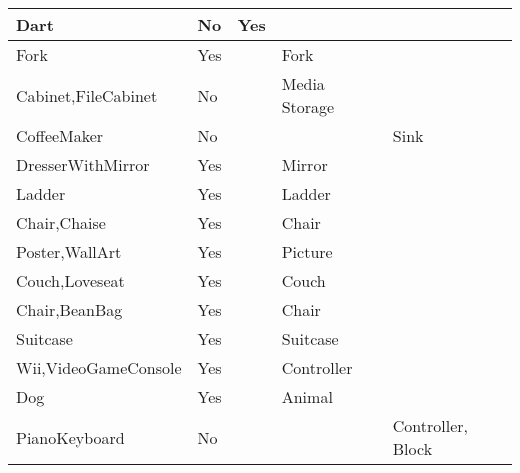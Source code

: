 \documentclass{article}
\begin{document}
\begin{longtable}{|l|l|l|l|l|}
Dart                                     & No               & Yes                            &                &                             \\ \hline
Fork                                     & Yes              &                                & Fork           &                             \\ \hline
Cabinet,FileCabinet                      & No               &                                & Media Storage  &                             \\ \hline
CoffeeMaker                              & No               &                                &                & Sink                        \\ \hline
DresserWithMirror                        & Yes              &                                & Mirror         &                             \\ \hline
Ladder                                   & Yes              &                                & Ladder         &                             \\ \hline
Chair,Chaise                             & Yes              &                                & Chair          &                             \\ \hline
Poster,WallArt                           & Yes              &                                & Picture        &                             \\ \hline
Couch,Loveseat                           & Yes              &                                & Couch          &                             \\ \hline
Chair,BeanBag                            & Yes              &                                & Chair          &                             \\ \hline
Suitcase                                 & Yes              &                                & Suitcase       &                             \\ \hline
Wii,VideoGameConsole                     & Yes              &                                & Controller     &                             \\ \hline
Dog                                      & Yes              &                                & Animal         &                             \\ \hline
PianoKeyboard                            & No               &                                &                & Controller, Block           \\ \hline

\end{longtable}
\end{document}
